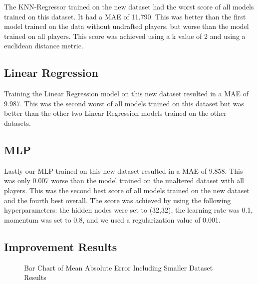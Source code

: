 \documentclass{article}
\begin{document}
The KNN-Regressor trained on the new dataset had the worst score of all models
trained on this dataset. It had a MAE of 11.790. This was better than the first
model trained on the data without undrafted players, but worse than the model
trained on all players. This score was achieved using a k value of 2 and using a
euclidean distance metric.

\subsection{Linear Regression}

Training the Linear Regression model on this new dataset resulted in a MAE of
9.987. This was the second worst of all models trained on this dataset but was
better than the other two Linear Regression models trained on the other
datasets.

\subsection{MLP}

Lastly our MLP trained on this new dataset resulted in a MAE of 9.858. This was
only 0.007 worse than the model trained on the unaltered dataset with all
players. This was the second best score of all models trained on the new dataset
and the fourth best overall. The score was achieved by using the following
hyperparameters: the hidden nodes were set to (32,32), the learning rate was
0.1, momentum was set to 0.8, and we used a regularization value of 0.001.

\subsection{Improvement Results}

\begin{figure}
	\begin{center}
    \caption{Bar Chart of Mean Absolute Error Including Smaller Dataset Results}
    \label{fig:improved_results}
	\end{center}
\end{figure}
\end{document}
